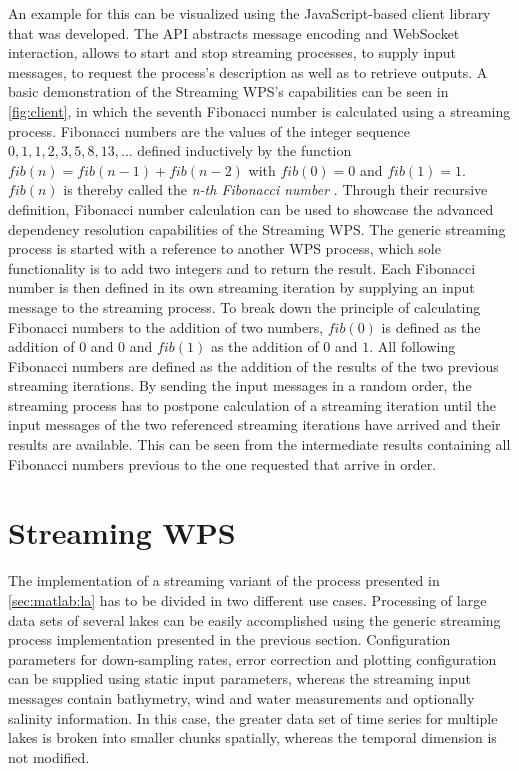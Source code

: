   An example for this can be visualized using the JavaScript-based client library that was developed. The \acs{API} abstracts message encoding and WebSocket interaction, allows to start and stop streaming processes, to supply input messages, to request the process's description as well as to retrieve outputs. A basic demonstration of the Streaming WPS's capabilities can be seen in \cref{fig:client}, in which the seventh Fibonacci number is calculated using a streaming process. Fibonacci numbers are the values of the integer sequence $0, 1, 1, 2, 3, 5, 8, 13, \dots$ defined inductively by the function $fib(n) = fib(n-1) + fib(n-2)$ with $fib(0) = 0$ and $fib(1) = 1$. $fib(n)$ is thereby called the \emph{n-th Fibonacci number} \citep{fibonacci}. Through their recursive definition, Fibonacci number calculation can be used to showcase the advanced dependency resolution capabilities of the Streaming WPS. The generic streaming process is started with a reference to another WPS process, which sole functionality is to add two integers and to return the result. Each Fibonacci number is then defined in its own streaming iteration by supplying an input message to the streaming process. To break down the principle of calculating Fibonacci numbers to the addition of two numbers, $fib(0)$ is defined as the addition of $0$ and $0$ and $fib(1)$ as the addition of $0$ and $1$. All following Fibonacci numbers are defined as the addition of the results of the two previous streaming iterations. By sending the input messages in a random order, the streaming process has to postpone calculation of a streaming iteration until the input messages of the two referenced streaming iterations have arrived and their results are available. This can be seen from the intermediate results containing all Fibonacci numbers previous to the one requested that arrive in order.

\section{Streaming \la WPS}
  The implementation of a streaming variant of the \la process presented in \cref{sec:matlab:la} has to be divided in two different use cases. Processing of large data sets of several lakes can be easily accomplished using the generic streaming process implementation presented in the previous section. Configuration parameters for down-sampling rates, error correction and plotting configuration can be supplied using static input parameters, whereas the streaming input messages contain bathymetry, wind and water measurements and optionally salinity information. In this case, the greater data set of time series for multiple lakes is broken into smaller chunks spatially, whereas the temporal dimension is not modified.

